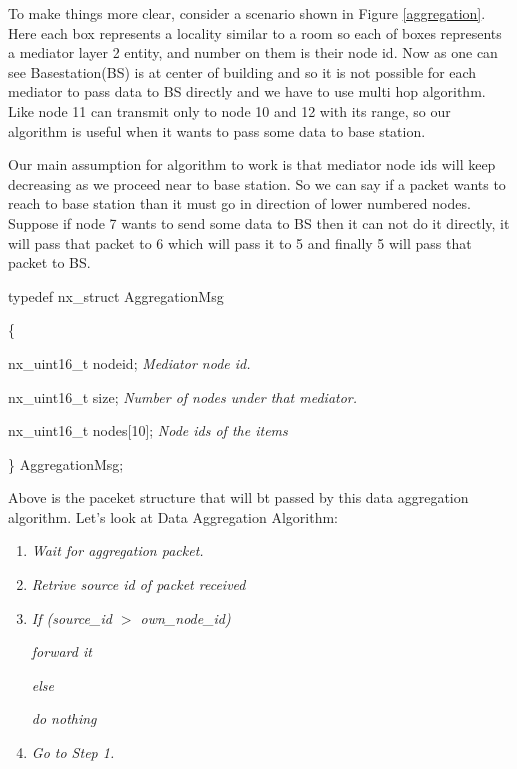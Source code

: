 \documentclass [a4paper,12pt]{book}
\begin{document}
To make things more clear, consider a scenario shown in Figure \ref{aggregation}. Here each box represents a locality similar to a room so each of boxes represents a mediator layer 2 entity, and number on them is their node id. Now as one can see Basestation(BS) is at center of building and so it is not possible for each mediator to pass data to BS directly and we have to use multi hop algorithm. Like node 11 can transmit only to node 10 and 12 with its range, so our algorithm is useful when it wants to pass some data to base station.

Our main assumption for algorithm to work is that mediator node ids will keep decreasing as we proceed near to base station. So we can say if a packet wants to reach to base station than it must go in direction of lower numbered nodes. Suppose if node 7 wants to send some data to BS then it can not do it directly, it will pass that packet to 6 which will pass it to 5 and finally 5 will pass that packet to BS.


typedef nx\_struct AggregationMsg

\{

  \hspace{2em}nx\_uint16\_t nodeid;\hspace*{3em}	\emph{Mediator node id.}

  \hspace{2em}nx\_uint16\_t size;\hspace*{4em}	\emph{Number of nodes under that mediator.}

  \hspace{2em}nx\_uint16\_t nodes[10];\hspace*{2em}	\emph{Node ids of the items}

\} AggregationMsg;


Above is the paceket structure that will bt passed by this data aggregation algorithm. Let's look at Data Aggregation Algorithm:
\begin{framed}
\begin{enumerate}[1.]
\item \textit{Wait for aggregation packet.}
\item \textit{Retrive source id of packet received}
\item \textit{If (source\_id $>$ own\_node\_id)}

\hspace*{2em} \textit{forward it}

\textit{else}

\hspace*{2em} \textit{do nothing}
\item \textit{Go to Step 1.}
\end{enumerate}
\end{framed}
\end{document}
